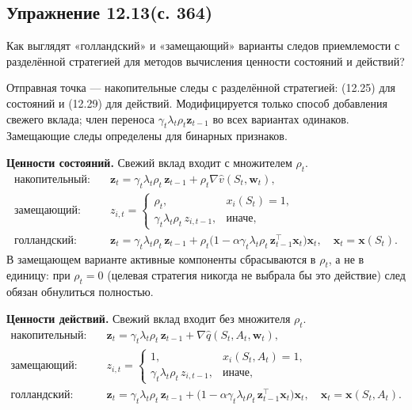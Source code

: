 \subsection{Упражнение 12.13(с. 364)}
Как выглядят «голландский» и «замещающий» варианты следов приемлемости с
разделённой стратегией для методов вычисления ценности состояний и действий?

\begin{solution}
    Отправная точка --- накопительные следы с разделённой стратегией: (12.25) для
    состояний и (12.29) для действий. Модифицируется только способ добавления
    свежего вклада; член переноса $\gamma_t\lambda_t\rho_t\mathbf z_{t-1}$ во всех
    вариантах одинаков. Замещающие следы определены для бинарных признаков.

    \textbf{Ценности состояний.} Свежий вклад входит с множителем $\rho_t$.
    \begin{align*}
        \text{накопительный:}\quad
        &\mathbf z_t = \gamma_t\lambda_t\rho_t\,\mathbf z_{t-1} + \rho_t\nabla\hat v(S_t,\mathbf w_t),\\
        \text{замещающий:}\quad
        &z_{i,t} =
        \begin{cases}
            \rho_t, & x_i(S_t) = 1,\\
            \gamma_t\lambda_t\rho_t\,z_{i,t-1}, & \text{иначе},
        \end{cases}\\
        \text{голландский:}\quad
        &\mathbf z_t = \gamma_t\lambda_t\rho_t\,\mathbf z_{t-1}
        + \rho_t\big(1 - \alpha\gamma_t\lambda_t\rho_t\,\mathbf z_{t-1}^\top\mathbf x_t\big)\mathbf x_t,
        \quad \mathbf x_t = \mathbf x(S_t).
    \end{align*}
    В замещающем варианте активные компоненты сбрасываются в $\rho_t$, а не в
    единицу: при $\rho_t=0$ (целевая стратегия никогда не выбрала бы это действие)
    след обязан обнулиться полностью.

    \textbf{Ценности действий.} Свежий вклад входит без множителя $\rho_t$.
    \begin{align*}
        \text{накопительный:}\quad
        &\mathbf z_t = \gamma_t\lambda_t\rho_t\,\mathbf z_{t-1} + \nabla\hat q(S_t,A_t,\mathbf w_t),\\
        \text{замещающий:}\quad
        &z_{i,t} =
        \begin{cases}
            1, & x_i(S_t,A_t) = 1,\\
            \gamma_t\lambda_t\rho_t\,z_{i,t-1}, & \text{иначе},
        \end{cases}\\
        \text{голландский:}\quad
        &\mathbf z_t = \gamma_t\lambda_t\rho_t\,\mathbf z_{t-1}
        + \big(1 - \alpha\gamma_t\lambda_t\rho_t\,\mathbf z_{t-1}^\top\mathbf x_t\big)\mathbf x_t,
        \quad \mathbf x_t = \mathbf x(S_t,A_t).
    \end{align*}


\end{solution}

